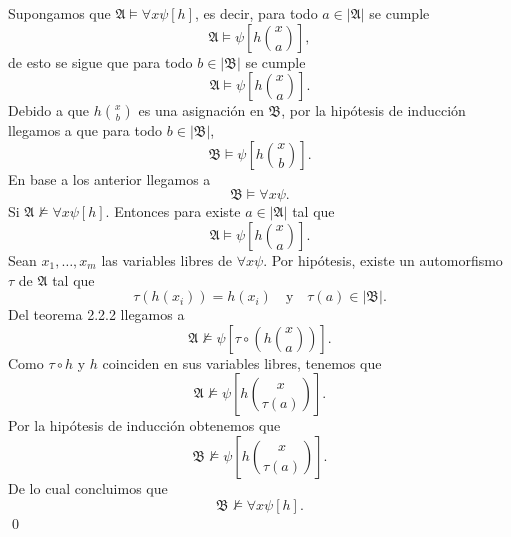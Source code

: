 Supongamos que $\mathfrak{A} \models \forall x \psi [h]$, es decir, para todo $a \in |\mathfrak{A}|$ se cumple
\[ \mathfrak{A} \models \psi \left[ h \binom{x}{a} \right], \]
de esto se sigue que para todo $b \in |\mathfrak{B}|$ se cumple
\[ \mathfrak{A} \models \psi \left[ h \binom{x}{a} \right]. \]
Debido a que $h \binom{x}{b}$ es una asignaci\'on en $\mathfrak{B}$, por la hip\'otesis de inducci\'on llegamos a que para todo $b \in |\mathfrak{B}|$,
\[ \mathfrak{B} \models \psi \left[ h \binom{x}{b} \right]. \]
En base a los anterior llegamos a 
\[ \mathfrak{B} \models \forall x \psi. \]
\newpage
Si $\mathfrak{A} \not\models \forall x \psi [h]$.
Entonces para existe $a \in |\mathfrak{A}|$ tal que
\[ \mathfrak{A} \models \psi \left[ h \binom{x}{a} \right]. \]
Sean $x_1, \dots, x_m$ las variables libres de $\forall x \psi$.
Por hip\'otesis, existe un automorfismo $\tau$ de $\mathfrak{A}$ tal que 
\[ \tau (h(x_i)) = h(x_i) \quad \text{y} \quad \tau (a) \in |\mathfrak{B}|. \]
Del teorema 2.2.2 llegamos a 
\[ \mathfrak{A} \not\models \psi \left[ \tau \circ \left( h \binom{x}{a} \right) \right]. \]
Como $\tau \circ h$ y $h$ coinciden en sus variables libres, tenemos que 
\[ \mathfrak{A} \not\models \psi \left[ h \binom{x}{\tau(a)} \right]. \]
Por la hip\'otesis de inducci\'on obtenemos que 
\[ \mathfrak{B} \not\models \psi \left[ h \binom{x}{\tau(a)} \right]. \]
De lo cual concluimos que 
\[ \mathfrak{B} \not\models \forall x \psi [h]. \] \qed


